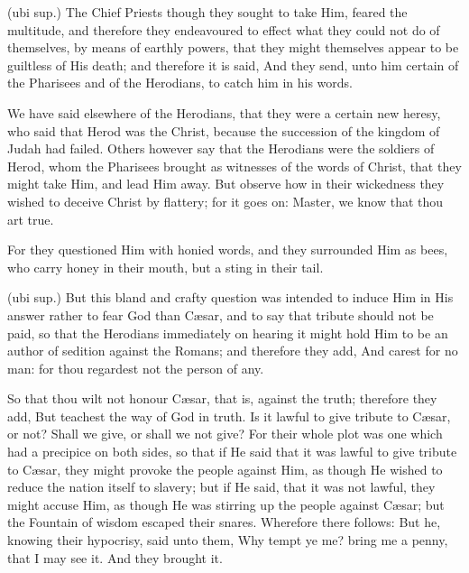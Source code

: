  

 (ubi sup.) The Chief Priests though they sought to take Him, feared the multitude, and therefore they endeavoured to effect what they could not do of themselves, by means of earthly powers, that they might themselves appear to be guiltless of His death; and therefore it is said, And they send, unto him certain of the Pharisees and of the Herodians, to catch him in his words.

 We have said elsewhere of the Herodians, that they were a certain new heresy, who said that Herod was the Christ, because the succession of the kingdom of Judah had failed. Others however say that the Herodians were the soldiers of Herod, whom the Pharisees brought as witnesses of the words of Christ, that they might take Him, and lead Him away. But observe how in their wickedness they wished to deceive Christ by flattery; for it goes on: Master, we know that thou art true.

 For they questioned Him with honied words, and they surrounded Him as bees, who carry honey in their mouth, but a sting in their tail.

 (ubi sup.) But this bland and crafty question was intended to induce Him in His answer rather to fear God than Cæsar, and to say that tribute should not be paid, so that the Herodians immediately on hearing it might hold Him to be an author of sedition against the Romans; and therefore they add, And carest for no man: for thou regardest not the person of any.

 So that thou wilt not honour Cæsar, that is, against the truth; therefore they add, But teachest the way of God in truth. Is it lawful to give tribute to Cæsar, or not? Shall we give, or shall we not give? For their whole plot was one which had a precipice on both sides, so that if He said that it was lawful to give tribute to Cæsar, they might provoke the people against Him, as though He wished to reduce the nation itself to slavery; but if He said, that it was not lawful, they might accuse Him, as though He was stirring up the people against Cæsar; but the Fountain of wisdom escaped their snares. Wherefore there follows: But he, knowing their hypocrisy, said unto them, Why tempt ye me? bring me a penny, that I may see it. And they brought it.

